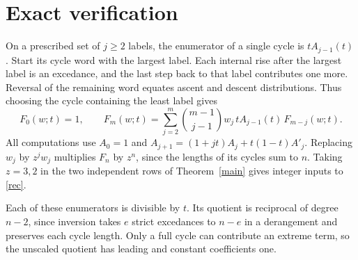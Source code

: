 \documentclass[11pt]{article}
\begin{document}
\section{Exact verification}
On a prescribed set of $j\ge2$ labels, the enumerator of a single cycle is $tA_{j-1}(t)$. Start its cycle word with the largest label. Each internal rise after the largest label is an excedance, and the last step back to that label contributes one more. Reversal of the remaining word equates ascent and descent distributions. Thus choosing the cycle containing the least label gives
\begin{equation}\label{rec}
 F_0(w;t)=1,\qquad
 F_m(w;t)=\sum_{j=2}^m \binom{m-1}{j-1}
            w_j\,tA_{j-1}(t)\,F_{m-j}(w;t).
\end{equation}
All computations use $A_0=1$ and $A_{j+1}=(1+jt)A_j+t(1-t)A'_j$. Replacing $w_j$ by $z^j w_j$ multiplies $F_n$ by $z^n$, since the lengths of its cycles sum to $n$. Taking $z=3,2$ in the two independent rows of Theorem~\ref{main} gives integer inputs to \eqref{rec}.

Each of these enumerators is divisible by $t$. Its quotient is reciprocal of degree $n-2$, since inversion takes $e$ strict excedances to $n-e$ in a derangement and preserves each cycle length. Only a full cycle can contribute an extreme term, so the unscaled quotient has leading and constant coefficients one.
\end{document}

